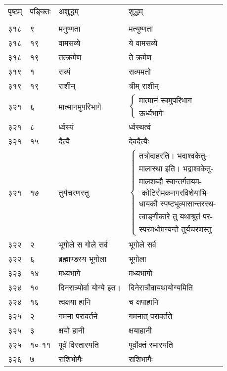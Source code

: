 \documentclass[11pt, openany]{book}
\begin{document}
\begin{longtable}{p{1cm} p{1.5cm} p{4cm} p{4cm}}
पृष्ठम् & पङ्क्तिः & अशुद्धम् & शुद्धम्\\
\vspace{2mm}\\

 ३१८ & ९  & मनुष्णता & मत्युष्णता \\

 ३१८ & १९ & वामसव्ये & ये वामसव्ये \\

 ३१८ & १९ & तत्क्रमेण & ते क्रमेण \\

 ३१९ & १ & सव्यं & सव्यमतो \\

 ३१९ & १९ & राशीन् & त्रीम् राशीन् \\

 ३२१ & ६ & मात्मानमुपरिभागे & $\begin{cases}\mbox{मात्मानं स्वमुपरिभाग}\\
\mbox{ऊर्ध्वभागे' }\end{cases}$\\

 ३२१ & ८ & र्ध्वस्यं & र्ध्वस्थत्वं \\

 ३२१ & १५ & दैत्यै & देवदैत्यैः \\

३२१ & १७ &तुर्यचरणस्तु  & $\begin{cases}\mbox{तत्रोदाहरति। भदाश्वकेतु-}\\
\mbox{मालास्था इति। भद्राश्वकेतु-}\\
\mbox{मालशब्दौ स्वान्तर्गतयम-}\\
\mbox{  कोटिरोमकनगरविशेयाभि-}\\
\mbox{धायकौ स्पष्टभूव्यासान्तरस्थ-}\\
\mbox{त्वाङ्गीकारे तु यथाश्रुतं पर-}\\
\mbox{स्परमधोमन्यन्ते तुर्यचरणस्तु }\end{cases}$\\

 ३२२ & २ & भूगोले स गोले सर्व & भूगोले सर्व \\

 ३२२ & ६ & ब्रह्माण्डस्य भूगोला & भूगोला \\

 ३२३ & १४ & मध्यभागे & मध्यभागो \\

 ३२४ & १० & दिनरात्र्योर्वा योग्ये इत। & दिनेरात्रौवायथायोग्यमिति \\

 ३२४ & १६ & त्वक्षया हानि &  च क्षपाहानि \\

 ३२५ & २ & गमना परावर्तने & गमनात् परावर्तते \\

 ३२५ & ३ & क्षयो हानी & क्षयाहानी \\

 ३२५ & १०-११ & पूर्वं विस्तारयति & पूर्वोक्तं स्मारयति \\

 ३२६ & ७ & राशिभोगैः & राशिभागैः \\
\end{longtable}
\end{document}
